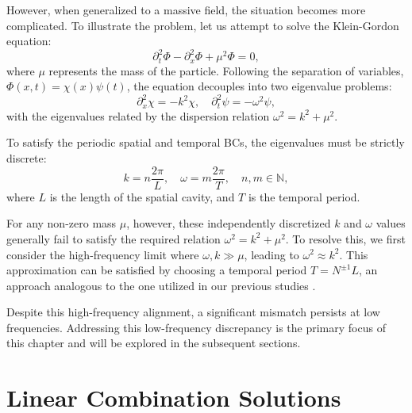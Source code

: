 However, when generalized to a massive field, the situation becomes more complicated. To illustrate the problem, let us attempt to solve the Klein-Gordon equation:
\begin{equation}\label{eq:PDE}
    \partial_t^2\Phi - \partial_x^2\Phi + \mu^2\Phi = 0,
\end{equation}
where \(\mu\) represents the mass of the particle.
Following the separation of variables, \(\Phi(x,t) = \chi(x)\psi(t)\), the equation decouples into two eigenvalue problems:
\begin{equation}
    \partial_x^2\chi = -k^2\chi, \quad  
    \partial_t^2\psi = -\omega^2\psi,
\end{equation}
with the eigenvalues related by the dispersion relation \(\omega^2 = k^2 + \mu^2\).

To satisfy the periodic spatial and temporal BCs, the eigenvalues must be strictly discrete:
\begin{equation}
    k = n\frac{2\pi}{L}, \quad \omega = m\frac{2\pi}{T}, \quad n,m\in\mathbb{N},
\end{equation}
where \(L\) is the length of the spatial cavity, and \(T\) is the temporal period.

For any non-zero mass $\mu$, however, these independently discretized $k$ and $\omega$ values generally fail to satisfy the required relation \(\omega^2 = k^2 + \mu^2\). To resolve this, we first consider the high-frequency limit where \(\omega, k \gg \mu\), leading to \(\omega^2 \approx k^2\). This approximation can be satisfied by choosing a temporal period $T = N^{\pm1}L $, an approach analogous to the one utilized in our previous studies \cite{PhysRevD.110.103528, pjz6-47jv}. 

Despite this high-frequency alignment, a significant mismatch persists at low frequencies. Addressing this low-frequency discrepancy is the primary focus of this chapter and will be explored in the subsequent sections.

\section{Linear Combination Solutions}\label{sec:linear_combine_solution}


